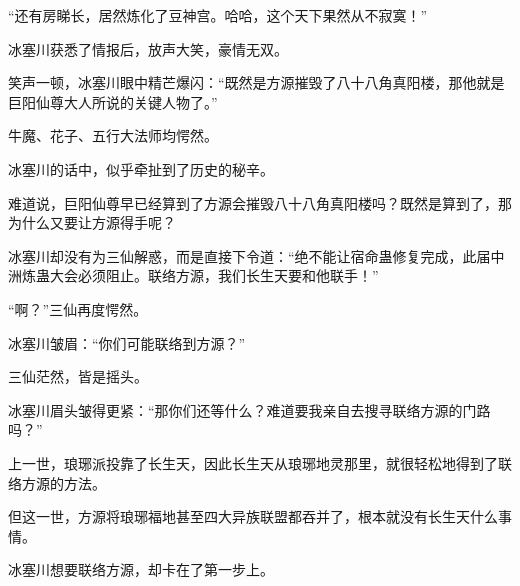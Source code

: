 \begin{this_body}
“还有房睇长，居然炼化了豆神宫。哈哈，这个天下果然从不寂寞！”

冰塞川获悉了情报后，放声大笑，豪情无双。

笑声一顿，冰塞川眼中精芒爆闪：“既然是方源摧毁了八十八角真阳楼，那他就是巨阳仙尊大人所说的关键人物了。”

牛魔、花子、五行大法师均愕然。

冰塞川的话中，似乎牵扯到了历史的秘辛。

难道说，巨阳仙尊早已经算到了方源会摧毁八十八角真阳楼吗？既然是算到了，那为什么又要让方源得手呢？

冰塞川却没有为三仙解惑，而是直接下令道：“绝不能让宿命蛊修复完成，此届中洲炼蛊大会必须阻止。联络方源，我们长生天要和他联手！”

“啊？”三仙再度愕然。

冰塞川皱眉：“你们可能联络到方源？”

三仙茫然，皆是摇头。

冰塞川眉头皱得更紧：“那你们还等什么？难道要我亲自去搜寻联络方源的门路吗？”

上一世，琅琊派投靠了长生天，因此长生天从琅琊地灵那里，就很轻松地得到了联络方源的方法。

但这一世，方源将琅琊福地甚至四大异族联盟都吞并了，根本就没有长生天什么事情。

冰塞川想要联络方源，却卡在了第一步上。

\end{this_body}

